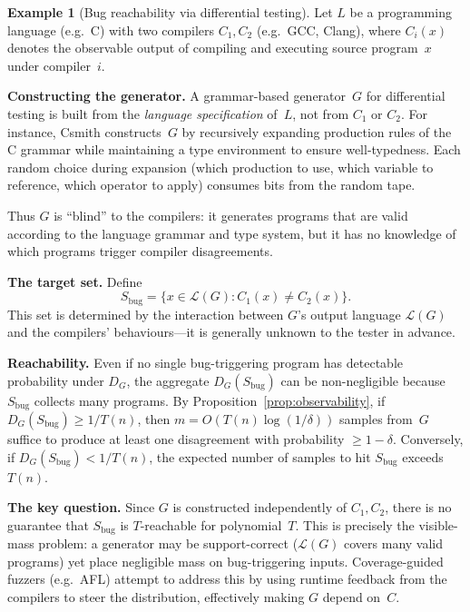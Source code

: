 \documentclass[11pt]{article}
\newcommand{\Lang}[1]{\mathcal{L}(#1)}
\theoremstyle{remark}
\theoremstyle{definition}
\newtheorem{example}[definition]{Example}
\begin{document}
\begin{example}[Bug reachability via differential testing]\label{ex:bug-reach}
Let $L$ be a programming language (e.g.\ C) with two compilers
$C_1, C_2$ (e.g.\ GCC, Clang), where $C_i(x)$ denotes the observable
output of compiling and executing source program~$x$ under compiler~$i$.

\medskip\noindent\textbf{Constructing the generator.}
A grammar-based generator~$G$ for differential testing is built from the
\emph{language specification} of~$L$, not from $C_1$ or $C_2$.
For instance, Csmith constructs~$G$ by recursively expanding production
rules of the C grammar while maintaining a type environment to ensure
well-typedness.  Each random choice during expansion (which production to
use, which variable to reference, which operator to apply) consumes bits
from the random tape.

Thus $G$ is ``blind'' to the compilers: it generates programs that are
valid according to the language grammar and type system, but it has no
knowledge of which programs trigger compiler disagreements.

\medskip\noindent\textbf{The target set.}
Define
\[
  S_{\mathrm{bug}} = \{x \in \Lang{G} : C_1(x) \ne C_2(x)\}.
\]
This set is determined by the interaction between $G$'s output language
$\Lang{G}$ and the compilers' behaviours---it is generally unknown to the
tester in advance.

\medskip\noindent\textbf{Reachability.}
Even if no single bug-triggering program has detectable probability under
$D_G$, the aggregate $D_G(S_{\mathrm{bug}})$ can be non-negligible because
$S_{\mathrm{bug}}$ collects many programs.
By Proposition~\ref{prop:observability}, if $D_G(S_{\mathrm{bug}}) \ge
1/T(n)$, then $m = O(T(n) \log(1/\delta))$ samples from~$G$ suffice to
produce at least one disagreement with probability $\ge 1 - \delta$.
Conversely, if $D_G(S_{\mathrm{bug}}) < 1/T(n)$, the expected number of
samples to hit $S_{\mathrm{bug}}$ exceeds $T(n)$.

\medskip\noindent\textbf{The key question.}
Since $G$ is constructed independently of $C_1, C_2$, there is no
guarantee that $S_{\mathrm{bug}}$ is $T$-reachable for polynomial~$T$.
This is precisely the visible-mass problem: a generator may be
support-correct ($\Lang{G}$ covers many valid programs) yet place
negligible mass on bug-triggering inputs.  Coverage-guided fuzzers
(e.g.\ AFL) attempt to address this by using runtime feedback from the
compilers to steer the distribution, effectively making $G$ depend
on~$C$.
\end{example}
\end{document}

